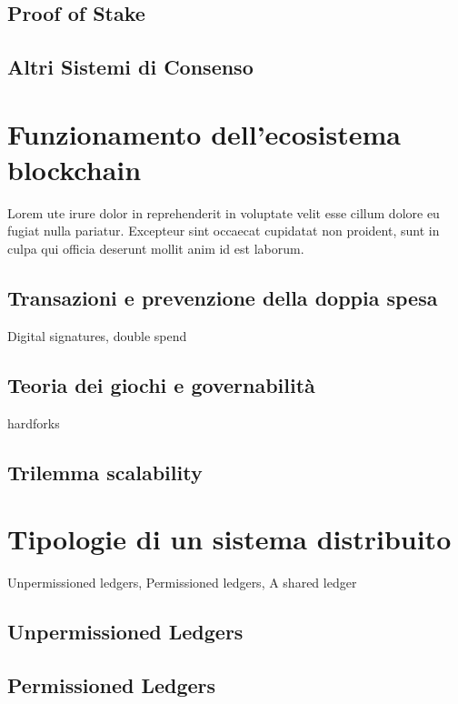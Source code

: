 \subsection{Proof of Stake}

\blindtext

\subsection{Altri Sistemi di Consenso} %

\section{Funzionamento dell'ecosistema blockchain} %

Lorem ute irure dolor in reprehenderit in voluptate velit esse cillum dolore eu fugiat nulla pariatur. Excepteur sint occaecat cupidatat non proident, sunt in culpa qui officia deserunt mollit anim id est laborum.

\subsection{Transazioni e prevenzione della doppia spesa}


Digital signatures, double spend

\subsection{Teoria dei giochi e governabilità}

hardforks

\subsection{Trilemma scalability}

\blindtext

\section{Tipologie di un sistema distribuito} %

Unpermissioned ledgers, Permissioned ledgers, A shared ledger

\subsection{Unpermissioned Ledgers}

\subsection{Permissioned Ledgers}


